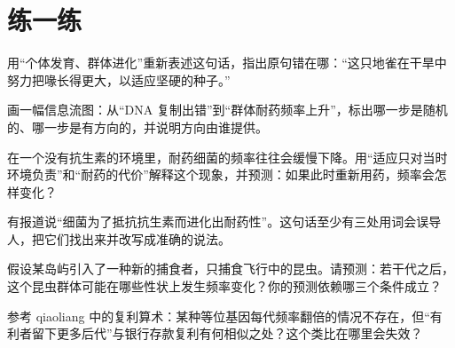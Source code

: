 \section*{练一练}

\begin{sikaoti}
\item 用“个体发育、群体进化”重新表述这句话，指出原句错在哪：“这只地雀在干旱中努力把喙长得更大，以适应坚硬的种子。”
\item 画一幅信息流图：从“DNA 复制出错”到“群体耐药频率上升”，标出哪一步是随机的、哪一步是有方向的，并说明方向由谁提供。
\item 在一个没有抗生素的环境里，耐药细菌的频率往往会缓慢下降。用“适应只对当时环境负责”和“耐药的代价”解释这个现象，并预测：如果此时重新用药，频率会怎样变化？
\item 有报道说“细菌为了抵抗抗生素而进化出耐药性”。这句话至少有三处用词会误导人，把它们找出来并改写成准确的说法。
\item 假设某岛屿引入了一种新的捕食者，只捕食飞行中的昆虫。请预测：若干代之后，这个昆虫群体可能在哪些性状上发生频率变化？你的预测依赖哪三个条件成立？
\item 参考 qiaoliang 中的复利算术：某种等位基因每代频率翻倍的情况不存在，但“有利者留下更多后代”与银行存款复利有何相似之处？这个类比在哪里会失效？
\end{sikaoti}
